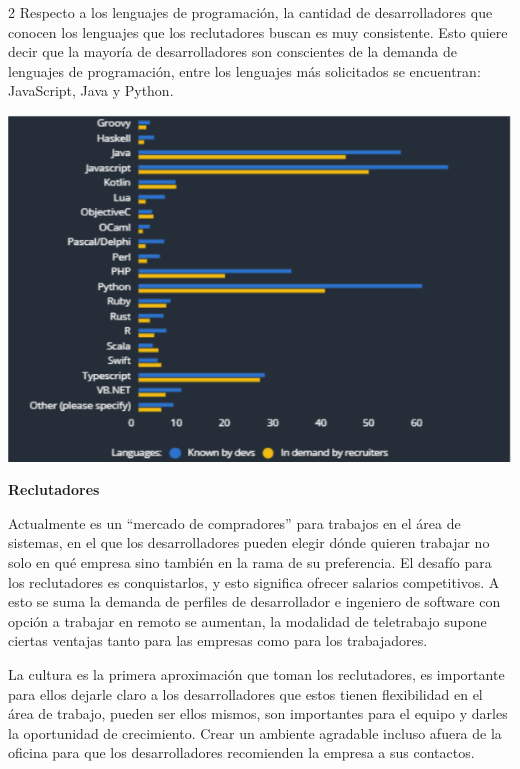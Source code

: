 \documentclass[12pt,spanish,Letterpaper,openany]{book}
\begin{document}
\begin {multicols}{2}
Respecto a los lenguajes de programación, la cantidad de desarrolladores que conocen los lenguajes que los reclutadores buscan es muy consistente. Esto quiere decir que la mayoría de desarrolladores son conscientes de la demanda de lenguajes de programación, entre los lenguajes más solicitados se encuentran: JavaScript, Java y Python.

\begin {flushleft}
\noindent\begin{minipage}[c]{\columnwidth}
\centering

\includegraphics[width=1\linewidth]{images/pareja40_image2}

\end{minipage}
\end {flushleft}

\textbf{Reclutadores}

Actualmente es un ``mercado de compradores'' para trabajos en el área de sistemas, en el que los desarrolladores pueden elegir dónde quieren trabajar no solo en qué empresa sino también en la rama de su preferencia. El desafío para los reclutadores es conquistarlos, y esto significa ofrecer salarios competitivos. A esto se suma la demanda de perfiles de desarrollador e ingeniero de software con opción a trabajar en remoto se aumentan, la modalidad de teletrabajo supone ciertas ventajas tanto para las empresas como para los trabajadores.

La cultura es la primera aproximación que toman los reclutadores, es importante para ellos dejarle claro a los desarrolladores que estos tienen flexibilidad en el área de trabajo, pueden ser ellos mismos, son importantes para el equipo y darles la oportunidad de crecimiento. Crear un ambiente agradable incluso afuera de la oficina para que los desarrolladores recomienden la empresa a sus contactos.


\end{multicols}
\end{document}
